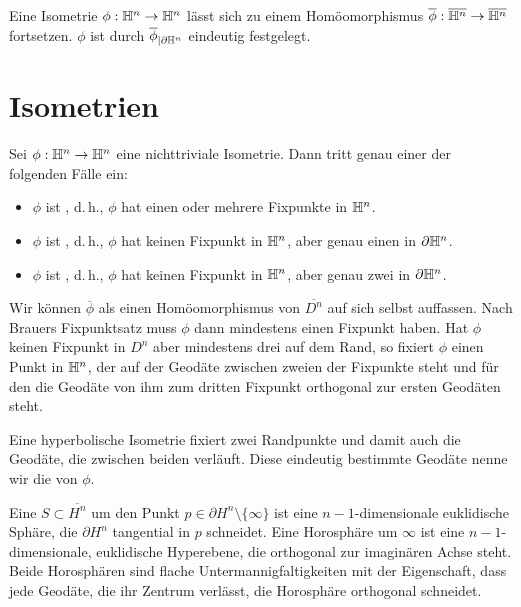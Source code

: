 \documentclass{book}
\begin{document}
\Lem{}
Eine Isometrie $\phi : \mathbb{H}^n \overset{}{\rightarrow} \mathbb{H}^n$ lässt sich zu einem Homöomorphismus $\overline{\phi} : \overline{\mathbb{H}^n} \overset{}{\rightarrow} \overline{\mathbb{H}^n} $ fortsetzen. $\phi$ ist durch $\overline{\phi}_{|\partial \mathbb{H}^n}$ eindeutig festgelegt.

\section{Isometrien}
\Prop{}
Sei $\phi : \mathbb{H}^n \overset{}{\rightarrow} \mathbb{H}^n$ eine nichttriviale Isometrie. Dann tritt genau einer der folgenden Fälle ein:
\begin{itemize}
	\item $\phi$ ist , d.\,h., $\phi$ hat einen oder mehrere Fixpunkte in $\mathbb{H}^n$.
	\item $\phi$ ist , d.\,h., $\phi$ hat keinen Fixpunkt in $\mathbb{H}^n$, aber genau einen in $\partial \mathbb{H}^n$.
	\item $\phi$ ist , d.\,h., $\phi$ hat keinen Fixpunkt in $\mathbb{H}^n$, aber genau zwei in $\partial \mathbb{H}^n$.
\end{itemize}
\begin{Beweis}{}
Wir können $\overline{\phi}$ als einen Homöomorphismus von $\overline{D^n}$ auf sich selbst auffassen. Nach Brauers Fixpunktsatz muss $\phi$ dann mindestens einen Fixpunkt haben. Hat $\phi$ keinen Fixpunkt in $D^n$ aber mindestens drei auf dem Rand, so fixiert $\phi$ einen Punkt in $\mathbb{H}^n$, der auf der Geodäte zwischen zweien der Fixpunkte steht und für den die Geodäte von ihm zum dritten Fixpunkt orthogonal zur ersten Geodäten steht.
\end{Beweis}

\Def{}
Eine hyperbolische Isometrie fixiert zwei Randpunkte und damit auch die Geodäte, die zwischen beiden verläuft. Diese eindeutig bestimmte Geodäte nenne wir die  von $\phi$.

\Def{}
Eine  $S \subset \overline{H^n}$ um den Punkt $p \in \partial H^n\setminus\{\infty\}$ ist eine $n-1$-dimensionale euklidische Sphäre, die $\partial H^n$ tangential in $p$ schneidet. Eine Horosphäre um $\infty$ ist eine $n-1$-dimensionale, euklidische Hyperebene, die orthogonal zur imaginären Achse steht.\\
Beide Horosphären sind flache Untermannigfaltigkeiten mit der Eigenschaft, dass jede Geodäte, die ihr Zentrum verlässt, die Horosphäre orthogonal schneidet.
\end{document}
